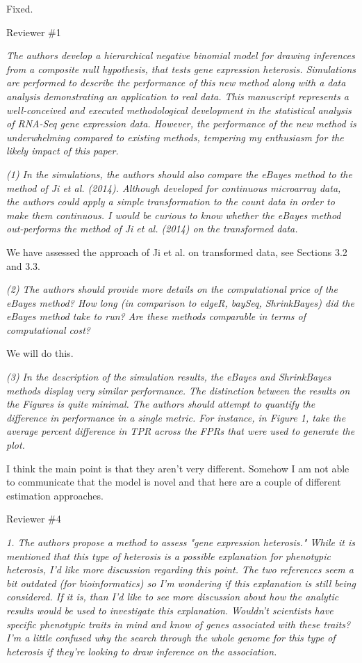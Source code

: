\documentclass{article}
\newcommand{\comment}[1]{\textit{#1}}
\newcommand{\response}[1]{#1}
\newcommand{\todo}[1]{{\color{red} #1}}
\begin{document}
\response{Fixed.}

Reviewer \#1

\comment{The authors develop a hierarchical negative binomial model for drawing inferences from a composite null hypothesis, that tests gene expression heterosis. Simulations are performed to describe the performance of this new method along with a data analysis demonstrating an application to real data. This manuscript represents a well-conceived and executed methodological development in the statistical analysis of RNA-Seq gene expression data. However, the performance of the new method is underwhelming compared to existing methods, tempering my enthusiasm for the likely impact of this paper.}

\comment{(1) In the simulations, the authors should also compare the eBayes method to the method of Ji et al. (2014). Although developed for continuous microarray data, the authors could apply a simple transformation to the count data in order to make them continuous. I would be curious to know whether the eBayes method out-performs the method of Ji et al. (2014) on the transformed data.}


\response{We have assessed the approach of Ji et al. on transformed data, see Sections 3.2 and 3.3.}

\comment{(2) The authors should provide more details on the computational price of the eBayes method? How long (in comparison to edgeR, baySeq, ShrinkBayes) did the eBayes method take to run? Are these methods comparable in terms of computational cost?}

\todo{We will do this.}

\comment{(3) In the description of the simulation results, the eBayes and ShrinkBayes methods display very similar performance. The distinction between the results on the Figures is quite minimal. The authors should attempt to quantify the difference in performance in a single metric. For instance, in Figure 1, take the average percent difference in TPR across the FPRs that were used to generate the plot.}

\todo{I think the main point is that they aren't very different. Somehow I am not able to communicate that the model is novel and that here are a couple of different estimation approaches.}

Reviewer \#4

\comment{1. The authors propose a method to assess "gene expression heterosis."   While it is mentioned that this type of heterosis is a possible explanation for phenotypic heterosis, I'd like more discussion regarding this point.  The two references seem a bit outdated (for bioinformatics) so I'm wondering if this explanation is still being considered.  If it is, than I'd like to see more discussion about how the analytic results would be used to investigate this explanation.   Wouldn't scientists have specific phenotypic traits in mind and know of genes associated with these traits?  I'm a little confused why the search through the whole genome for this type of heterosis if they're looking to draw inference on the association.}
\end{document}
